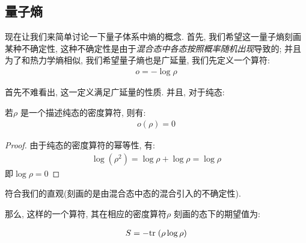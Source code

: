 \subsection{量子熵}

现在让我们来简单讨论一下量子体系中熵的概念. 首先, 我们希望这一量子熵刻画某种不确定性,
这种不确定性是由于\emph{混合态中各态按照概率随机出现}导致的; 并且为了和热力学熵相似,
我们希望量子熵也是广延量, 我们先定义一个算符:
\begin{equation}
  \begin{aligned}
    o = -\log \rho
  \end{aligned}
\end{equation}

首先不难看出, 这一定义满足广延量的性质. 并且, 对于纯态:

\begin{theorem}[$o$ 对纯态为$0$]
若$\rho$ 是一个描述纯态的密度算符, 则有:  
\begin{equation}
  \begin{aligned}
    o(\rho) = 0
  \end{aligned}
\end{equation}
\end{theorem}
\begin{proof}
  由于纯态的密度算符的幂等性, 有:
  \begin{equation}
    \begin{aligned}
      \log(\rho^{2}) = \log \rho + \log \rho = \log \rho
    \end{aligned}
  \end{equation}
  即$\log \rho=0$
\end{proof}

符合我们的直观(刻画的是由混合态中态的混合引入的不确定性).

那么, 这样的一个算符, 其在相应的密度算符$\rho$ 刻画的态下的期望值为:

\begin{equation}
  \begin{aligned}
    S = -{\rm tr}\; (\rho \log \rho)
  \end{aligned}
\end{equation}

